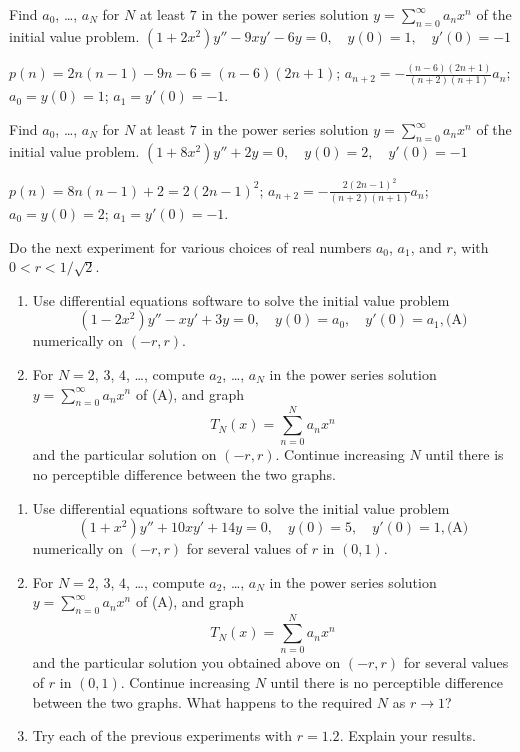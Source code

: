 \documentclass{ximera}
\begin{document}
\begin{problem}\label{exer:7.2.12} Find $a_0$, \dots, $a_N$ for $N$ at least $7$ in the power series solution $y=\sum_{n=0}^\infty a_nx^n$
of the initial value problem.  $(1+2x^2)y''-9xy'-6y=0,\quad y(0)=1,\quad
y'(0)=-1$

\begin{solution}
    $p(n)=2n(n-1)-9n-6=(n-6)(2n+1)$;
$a_{n+2}=-\frac{(n-6)(2n+1)}{(n+2)(n+1)}a_n$;
$a_0=y(0)=1$; $a_1=y'(0)=-1$.

\end{solution}
\end{problem}

\begin{problem}\label{exer:7.2.13}  Find $a_0$, \dots, $a_N$ for $N$ at least $7$ in the power series solution $y=\sum_{n=0}^\infty a_nx^n$
of the initial value problem.
$(1+8x^2)y''+2y=0,\quad y(0)=2,\quad
y'(0)=-1$

\begin{solution}
    $p(n)=8n(n-1)+2=2(2n-1)^2$;
$a_{n+2}=-\frac{2(2n-1)^2}{(n+2)(n+1)}a_n$;
$a_0=y(0)=2$; $a_1=y'(0)=-1$.
\end{solution}
\end{problem}

\begin{problem}\label{exer:7.2.14}   
Do the next experiment for various choices of real numbers  $a_0$, $a_1$, and $r$, with $0<r<1/\sqrt2$.
\begin{enumerate}
\item %
Use differential equations software  to solve the initial
value problem
$$
(1-2x^2)y''-xy'+3y=0,\quad y(0)=a_0,\quad y'(0)=a_1,
\text{(A)}
$$
numerically on $(-r,r)$.
\item %
For $N=2$, $3$, $4$, \dots, compute $a_2$, \dots, $a_N$ in the power series
solution
$y=\sum_{n=0}^\infty a_nx^n$ of (A), and graph
$$
T_N(x)=\sum_{n=0}^N a_nx^n
$$
and the particular solution on $(-r,r)$.
Continue increasing $N$ until there is no perceptible
difference between the two graphs.
\end{enumerate}
\end{problem}

\begin{problem}\label{exer:7.2.15}    
\begin{enumerate}
\item %
Use differential equations software  to solve the initial value problem
$$
(1+x^2)y''+10xy'+14y=0,\quad y(0)=5,\quad y'(0)=1,
\text{(A)}
$$
numerically on $(-r,r)$ for several values of $r$ in $(0,1)$.
\item %
For $N=2$, $3$, $4$, \dots, compute $a_2$, \dots, $a_N$ in the power series
solution
$y=\sum_{n=0}^\infty a_nx^n$ of (A), and
graph
$$
T_N(x)=\sum_{n=0}^N a_nx^n
$$
and the particular solution you obtained above on $(-r,r)$ for several values of $r$ in $(0,1)$.
Continue increasing $N$ until there is no perceptible
difference between the two graphs. What happens to the required $N$
as $r\to1$?
\item %
Try each of the previous experiments with $r=1.2$. Explain your results.
\end{enumerate}
\end{problem}
\end{document}
